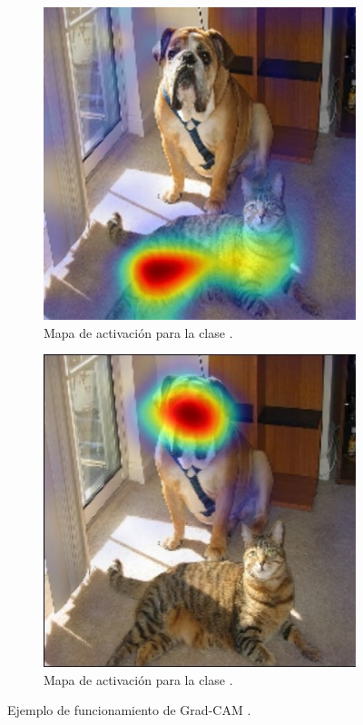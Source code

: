 \begin{figure}[!h]
\begin{subfigure}{0.28\textwidth}
        \includegraphics[width=\textwidth]{figures/2_theory/grad_cam__cat.jpg}
        \caption{Mapa de activación para la clase .}
        \label{fig__grad_cam__cat}
    \end{subfigure}  
    \begin{subfigure}{0.28\textwidth}
        \includegraphics[width=\textwidth]{figures/2_theory/grad_cam__dog.jpg}
        \caption{Mapa de activación para la clase .}
        \label{fig__grad_cam__dog}
    \end{subfigure}    
    \caption{Ejemplo de funcionamiento de Grad-CAM \cite{selvaraju_grad_cam_2017}.}
    \label{fig__grad_cam}          
\end{figure}

